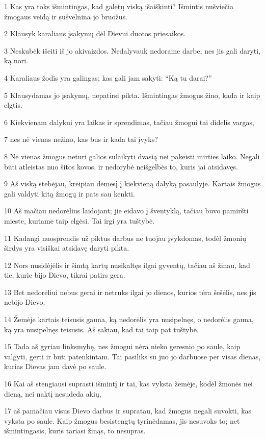 \par 1 Kas yra toks išmintingas, kad galėtų viską išaiškinti? Išmintis nušviečia žmogaus veidą ir sušvelnina jo bruožus. 
\par 2 Klausyk karaliaus įsakymų dėl Dievui duotos priesaikos. 
\par 3 Neskubėk išeiti iš jo akivaizdos. Nedalyvauk nedorame darbe, nes jis gali daryti, ką nori. 
\par 4 Karaliaus žodis yra galingas; kas gali jam sakyti: “Ką tu darai?” 
\par 5 Klausydamas jo įsakymų, nepatirsi pikta. Išmintingas žmogus žino, kada ir kaip elgtis. 
\par 6 Kiekvienam dalykui yra laikas ir sprendimas, tačiau žmogui tai didelis vargas, 
\par 7 nes nė vienas nežino, kas bus ir kada tai įvyks? 
\par 8 Nė vienas žmogus neturi galios sulaikyti dvasią nei pakeisti mirties laiko. Negali būti atleistas nuo šitos kovos, ir nedorybė neišgelbės to, kuris jai atsidavęs. 
\par 9 Aš viską stebėjau, kreipiau dėmesį į kiekvieną dalyką pasaulyje. Kartais žmogus gali valdyti kitą žmogų ir pats sau kenkti. 
\par 10 Aš mačiau nedorėlius laidojant; jie eidavo į šventyklą, tačiau buvo pamiršti mieste, kuriame taip elgėsi. Tai irgi yra tuštybė. 
\par 11 Kadangi nuosprendis už piktus darbus ne tuojau įvykdomas, todėl žmonių širdys yra visiškai atsidavę daryti pikta. 
\par 12 Nors nusidėjėlis ir šimtą kartų nusikaltęs ilgai gyventų, tačiau aš žinau, kad tie, kurie bijo Dievo, tikrai patirs gera. 
\par 13 Bet nedorėliui nebus gerai ir netruks ilgai jo dienos, kurios tėra šešėlis, nes jis nebijo Dievo. 
\par 14 Žemėje kartais teisusis gauna, ką nedorėlis yra nusipelnęs, o nedorėlis gauna, ką yra nusipelnęs teisusis. Aš sakiau, kad tai taip pat tuštybė. 
\par 15 Tada aš gyriau linksmybę, nes žmogui nėra nieko geresnio po saule, kaip valgyti, gerti ir būti patenkintam. Tai pasiliks su juo jo darbuose per visas dienas, kurias Dievas jam davė po saule. 
\par 16 Kai aš stengiausi suprasti išmintį ir tai, kas vyksta žemėje, kodėl žmonės nei dieną, nei naktį nesudeda akių, 
\par 17 aš pamačiau visus Dievo darbus ir supratau, kad žmogus negali suvokti, kas vyksta po saule. Kaip žmogus besistengtų tyrinėdamas, jis nesuvoks to; net išmintingasis, kuris tariasi žinąs, to nesupras.




